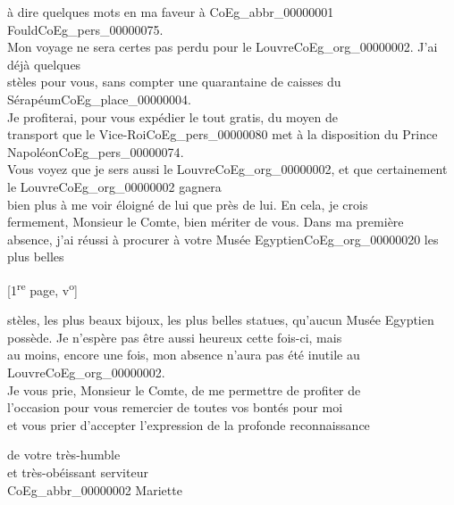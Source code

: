 \documentclass{book}
\begin{document}
{à dire quelques mots en ma faveur à \gls{CoEg_abbr_00000001} Fould\gls{CoEg_pers_00000075}.\\
\indent Mon voyage ne sera certes pas perdu pour le Louvre\gls{CoEg_org_00000002}. J’ai déjà quelques\\
stèles pour vous, sans compter une quarantaine de caisses du Sérapéum\gls{CoEg_place_00000004}.\\
Je profiterai, pour vous expédier le tout gratis, du moyen de\\
transport que le Vice-Roi\gls{CoEg_pers_00000080} met à la disposition du Prince Napoléon\gls{CoEg_pers_00000074}.\\
Vous voyez que je sers aussi le Louvre\gls{CoEg_org_00000002}, et que certainement le Louvre\gls{CoEg_org_00000002} gagnera\\
bien plus à me voir éloigné de lui que près de lui. En cela, je crois\\
fermement, Monsieur le Comte, bien mériter de vous. Dans ma première\\
absence, j’ai réussi à procurer à votre Musée Egyptien\gls{CoEg_org_00000020} les plus belles
{\footnotesize \begin{center} {[1\textsuperscript{re} page, v\textsuperscript{o}]}\end{center}}
\noindent stèles, les plus beaux bijoux, les plus belles statues, qu’aucun Musée Egyptien\\
possède. Je n’espère pas être aussi heureux cette fois-ci, mais\\
au moins, encore une fois, mon absence n’aura pas été inutile au\\
Louvre\gls{CoEg_org_00000002}.\\
\indent Je vous prie, Monsieur le Comte, de me permettre de profiter de\\
l’occasion pour vous remercier de toutes vos bontés pour moi\\
et vous prier d’accepter l’expression de la profonde reconnaissance
\begin{center}\hspace{5cm}de votre très-humble\\
\hspace{5cm}et très-obéissant serviteur\\
\hspace{5cm} \gls{CoEg_abbr_00000002} Mariette\end{center}
\hypertarget{CoEg_Mariette_1858-01-23}{}
}
\end{document}
